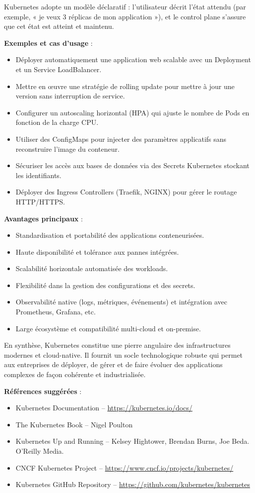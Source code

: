 Kubernetes adopte un modèle déclaratif  : l’utilisateur décrit l’état attendu (par exemple, «  je veux 3 réplicas de mon application  »), et le control plane s’assure que cet état est atteint et maintenu.

\textbf{Exemples et cas d’usage} :
\begin{itemize}
	\item Déployer automatiquement une application web scalable avec un Deployment et un Service LoadBalancer.
	\item Mettre en œuvre une stratégie de rolling update pour mettre à jour une version sans interruption de service.
	\item Configurer un autoscaling horizontal (HPA) qui ajuste le nombre de Pods en fonction de la charge CPU.
	\item Utiliser des ConfigMaps pour injecter des paramètres applicatifs sans reconstruire l’image du conteneur.
	\item Sécuriser les accès aux bases de données via des Secrets Kubernetes stockant les identifiants.
	\item Déployer des Ingress Controllers (Traefik, NGINX) pour gérer le routage HTTP/HTTPS.
\end{itemize}

\textbf{Avantages principaux} :
\begin{itemize}
	\item Standardisation et portabilité des applications conteneurisées.
	\item Haute disponibilité et tolérance aux pannes intégrées.
	\item Scalabilité horizontale automatisée des workloads.
	\item Flexibilité dans la gestion des configurations et des secrets.
	\item Observabilité native (logs, métriques, événements) et intégration avec Prometheus, Grafana, etc.
	\item Large écosystème et compatibilité multi-cloud et on-premise.
\end{itemize}

En synthèse, Kubernetes constitue une pierre angulaire des infrastructures modernes et cloud-native. Il fournit un socle technologique robuste qui permet aux entreprises de déployer, de gérer et de faire évoluer des applications complexes de façon cohérente et industrialisée.

\textbf{Références suggérées} :
\begin{itemize}
	\item Kubernetes Documentation – \url{https://kubernetes.io/docs/}
	\item The Kubernetes Book – Nigel Poulton
	\item Kubernetes Up and Running – Kelsey Hightower, Brendan Burns, Joe Beda. O’Reilly Media.
	\item CNCF Kubernetes Project – \url{https://www.cncf.io/projects/kubernetes/}
	\item Kubernetes GitHub Repository – \url{https://github.com/kubernetes/kubernetes}
\end{itemize}


